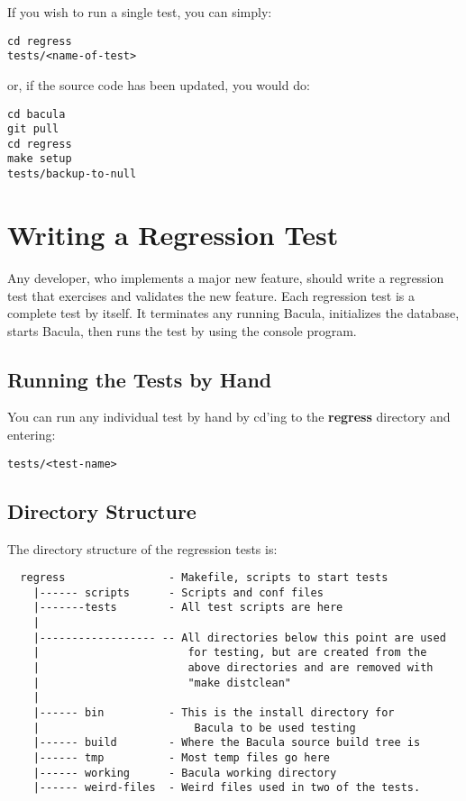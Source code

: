 If you wish to run a single test, you can simply:

\begin{verbatim}
cd regress
tests/<name-of-test>
\end{verbatim}

or, if the source code has been updated, you would do:

\begin{verbatim}
cd bacula
git pull
cd regress
make setup
tests/backup-to-null
\end{verbatim}


\section{Writing a Regression Test}

Any developer, who implements a major new feature, should write a regression
test that exercises and validates the new feature. Each regression test is a
complete test by itself. It terminates any running Bacula, initializes the
database, starts Bacula, then runs the test by using the console program.

\subsection{Running the Tests by Hand}

You can run any individual test by hand by cd'ing to the {\bf regress}
directory and entering:

\footnotesize
\begin{verbatim}
tests/<test-name>
\end{verbatim}
\normalsize

\subsection{Directory Structure}

The directory structure of the regression tests is:

\footnotesize
\begin{verbatim}
  regress                - Makefile, scripts to start tests
    |------ scripts      - Scripts and conf files
    |-------tests        - All test scripts are here
    |
    |------------------ -- All directories below this point are used
    |                       for testing, but are created from the
    |                       above directories and are removed with
    |                       "make distclean"
    |
    |------ bin          - This is the install directory for
    |                        Bacula to be used testing
    |------ build        - Where the Bacula source build tree is
    |------ tmp          - Most temp files go here
    |------ working      - Bacula working directory
    |------ weird-files  - Weird files used in two of the tests.
\end{verbatim}
\normalsize

